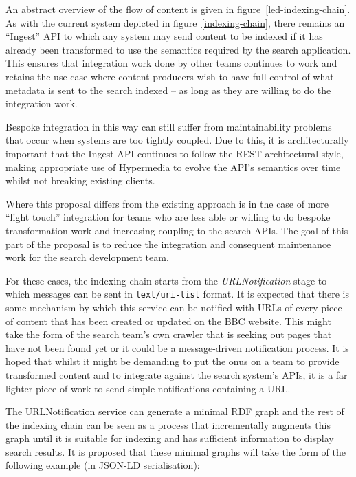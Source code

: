 An abstract overview of the flow of content is given in figure~\ref{led-indexing-chain}.
As with the current system depicted in figure~\ref{indexing-chain},
there remains an ``Ingest'' API to which any system may
send content to be indexed if it has already been transformed to
use the semantics required by the search application. This
ensures that integration work done by other teams continues to work
and retains the use case where content producers wish to have full
control of what metadata is sent to the search indexed -- as long as
they are willing to do the integration work.

Bespoke integration in this way can still suffer from maintainability
problems that occur when systems are too tightly coupled. Due to this,
it is architecturally important that the Ingest API continues to follow
the REST architectural style, making appropriate use of Hypermedia to
evolve the API's semantics over time whilst not breaking existing clients.

Where this proposal differs from the existing approach is in the case
of more ``light touch'' integration for teams who are less able or willing
to do bespoke transformation work and increasing coupling to the search
APIs. The goal of this part of the proposal is to reduce the integration
and consequent maintenance work for the search development team.

For these cases, the indexing chain starts from the \emph{URLNotification}
stage to which messages can be sent in
\texttt{text/uri-list}\cite{amundsen2011hypermedia} format. It is expected
that there is some mechanism by which this service can be notified with URLs
of every piece of content that has been created or updated on the BBC website.
This might take the form of the search team's own crawler that is seeking
out pages that have not been found yet or it could be a message-driven
notification process. It is hoped that whilst it might be demanding to
put the onus on a team
to provide transformed content and to integrate against the search system's
APIs, it is a far lighter piece of work to send simple notifications containing
a URL.

The URLNotification service can generate a minimal RDF graph and the
rest of the indexing chain can be seen as a process that incrementally
augments this graph until it is suitable for indexing and has sufficient
information to display search results. It is proposed that these minimal
graphs will take the form of the following example (in JSON-LD serialisation):

